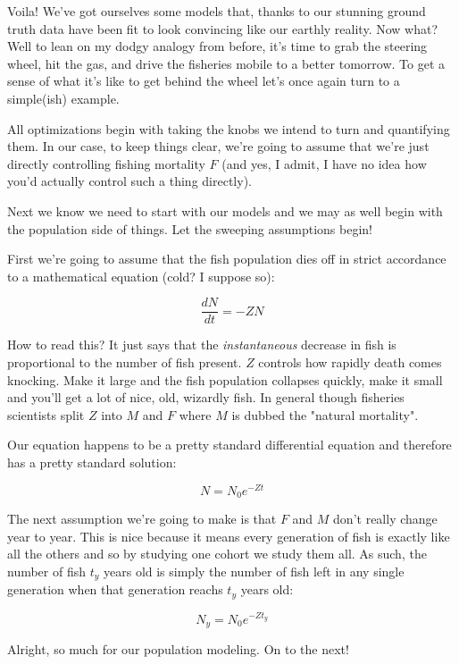 \documentclass[11pt,a5paper]{book}
\begin{document}
Voila! We've got ourselves some models that, thanks to our stunning ground truth data have been fit to look convincing like our earthly reality. Now what? Well to lean on my dodgy analogy from before, it's time to grab the steering wheel, hit the gas, and drive the fisheries mobile to a better tomorrow. To get a sense of what it's like to get behind the wheel let's once again turn to a simple(ish) example. 
\newline

All optimizations begin with taking the knobs we intend to turn and quantifying them. In our case, to keep things clear, we're going to assume that we're just directly controlling fishing mortality $F$ (and yes, I admit, I have no idea how you'd actually control such a thing directly). 
\newline

Next we know we need to start with our models and we may as well begin with the population side of things. Let the sweeping assumptions begin!
\newline

First we're going to assume that the fish population dies off in strict accordance to a mathematical equation (cold? I suppose so):

$$\frac{dN}{dt}=-ZN$$

How to read this? It just says that the \textit{instantaneous} decrease in fish is proportional to the number of fish present. $Z$ controls how rapidly death comes knocking. Make it large and the fish population collapses quickly, make it small and you'll get a lot of nice, old, wizardly fish. In general though fisheries scientists split $Z$ into $M$ and $F$ where $M$ is dubbed the "natural mortality". 
\newline

Our equation happens to be a pretty standard differential equation and therefore has a pretty standard solution:

$$N = N_0 e^{-Zt}$$

The next assumption we're going to make is that $F$ and $M$ don't really change year to year. This is nice because it means every generation of fish is exactly like all the others and so by studying one cohort we study them all. As such, the number of fish $t_y$ years old is simply the number of fish left in any single generation when that generation reachs $t_y$ years old:

$$N_y = N_0 e^{-Zt_y}$$

Alright, so much for our population modeling. On to the next!
\newline
\end{document}
